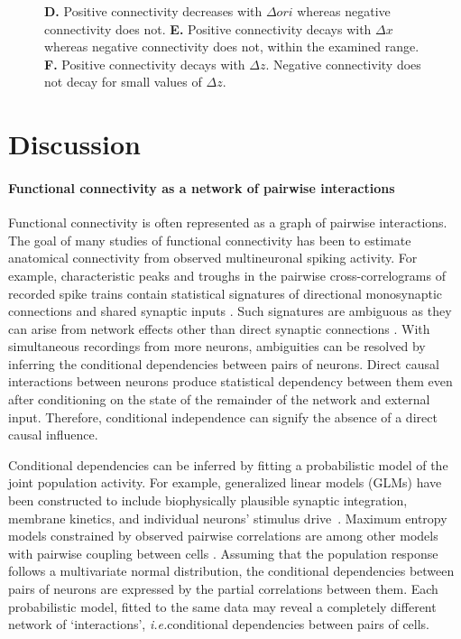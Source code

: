 \documentclass[10pt]{article}
\newcommand{\sq}[1]{\lq#1\rq}
\newcommand{\ie}{\emph{i.e.}\;}
\begin{document}
\begin{figure}[!ht]
{    {\bf D.} Positive connectivity decreases with $\Delta ori$ whereas negative connectivity does not.
    {\bf E.} Positive connectivity decays with $\Delta x$ whereas negative connectivity does not, within the examined range.
    {\bf F.} Positive connectivity decays with $\Delta z$. Negative connectivity does not decay for small values of $\Delta z$.
    }
\label{fig:6}
\end{figure}


\section*{Discussion}
\paragraph{Functional connectivity as a network of pairwise interactions}
Functional connectivity is often represented as a graph of pairwise interactions. The goal of many studies of functional connectivity has been to estimate  anatomical connectivity from  observed multineuronal spiking activity.  For example, characteristic peaks and troughs in the pairwise cross-correlograms of recorded spike trains contain statistical signatures of directional monosynaptic connections and shared synaptic inputs \cite{Gerstein:1964, Perkel:1967, Moore:1970, Alonso:1998, Denman:2013}.  Such signatures are ambiguous as they can arise from network effects other than direct synaptic connections \cite{Aertsen:1989}.  With simultaneous recordings from more neurons, ambiguities can be resolved by inferring the conditional dependencies between pairs of neurons.  Direct causal interactions between neurons produce statistical dependency between them even after conditioning on the state of the remainder of the network and external input. Therefore, conditional independence can signify the absence of a direct causal influence.  

Conditional dependencies can be inferred by fitting a probabilistic model of the joint population activity. For example, generalized linear models (GLMs) have been constructed to  include biophysically plausible synaptic integration, membrane kinetics, and individual neurons' stimulus drive~\cite{Pillow:2008}.  Maximum entropy models constrained by observed pairwise correlations are among other models with pairwise coupling between cells \cite{Schneidman:2006, Tkacik:2006, Yu:2008, Tang:2008, Shlens:2009}.  Assuming that the population response follows a multivariate normal distribution, the conditional dependencies between pairs of neurons are expressed by the partial correlations between them.   Each probabilistic model, fitted to the same data may reveal a completely different network of \sq{interactions},  \ie conditional dependencies between pairs of cells. 
\end{document}
